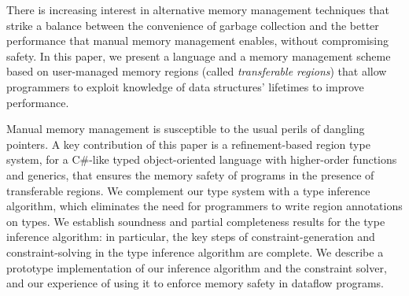 %
There is increasing interest in alternative memory management techniques
that strike a balance between the convenience of garbage collection and
the better performance that manual memory management enables, without
compromising safety.
%
In this paper, we present a language and a memory management scheme based
on user-managed memory regions (called \emph{transferable regions})
that allow programmers to exploit knowledge of data structures' lifetimes
to improve performance.

Manual memory management is susceptible to the usual perils of
dangling pointers. A key contribution of this paper is a
refinement-based region type system, for a C\#-like typed object-oriented
language with higher-order functions and generics, that ensures the
memory safety of programs in the presence of transferable regions.
We complement our type system with a type inference algorithm, which eliminates the need for programmers to write region annotations on types.
We establish soundness and partial completeness results for the type inference algorithm: in particular, the key steps of constraint-generation and constraint-solving in the type inference algorithm are complete. We describe a prototype implementation of our inference algorithm and the constraint solver, and our experience of using it to enforce memory safety in dataflow programs.


